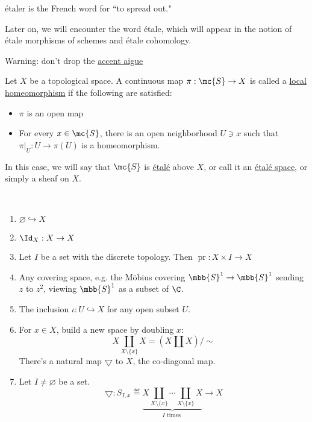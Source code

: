 \documentclass[x11names,reqno,14pt]{extarticle}
\newcommand{\into}{\hookrightarrow}
\begin{document}
\'etaler is the French word for ``to spread out." 

Later on, we will encounter the word \'etale, which will appear in the notion of \'etale morphisms of schemes and \'etale cohomology. 

Warning: don't drop the \underline{accent aigue}


Let $X$ be a topological space. A continuous map $\pi:\mc{S}\to X$ is called a \underline{local homeomorphism} if the following are satisfied:

\begin{itemize}

\item $\pi$ is an open map

\item For every $x \in \mc{S}$, there is an open neighborhood $U\ni x$ such that $\pi|_U:U\to \pi(U)$ is a homeomorphism.

\end{itemize}

In this case, we will say that $\mc{S}$ is \underline{\'etal\'e} above $X$, or call it an \underline{\'etal\'e space}, or simply a sheaf on $X$.

\exm\,

\begin{enumerate}

\item $\varnothing \into X$

\item $\Id_X:X\to X$

\item Let $I$ be a set with the discrete topology. Then $\operatorname{pr}:X\times I \to X$

\item Any covering space, e.g. the M\"obius covering $\mbb{S}^1 \to \mbb{S}^1$ sending $z$ to $z^2$, viewing $\mbb{S}^1$ as a subset of $\C$. 

\item The inclusion $\iota:U\into X$ for any open subset $U$. 

\item For $x \in X$, build a new space by doubling $x$:
\[
X \coprod_{X\setminus\{x\}} X = (X\coprod X)/\sim
\]
There's a natural map $\bigtriangledown$ to $X$, the co-diagonal map. 

\item Let $I \neq \varnothing$ be a set.  
\[
\bigtriangledown: S_{I,x} \eqdef \underbrace{X \coprod_{X\setminus\{x\}} \cdots \coprod_{X\setminus \{x\}} X}_{I\text{ times }}\to X
\]

\end{enumerate}
\end{document}
